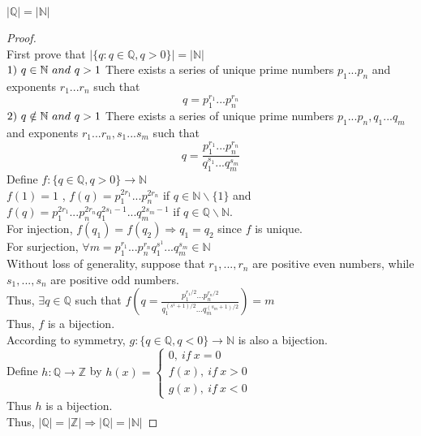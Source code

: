 \documentclass{article}
\begin{document}
\begin{flushleft}
	$\left|\mathbb{Q}\right|=\left|\mathbb{N}\right|$
\end{flushleft}
\begin{proof}
	~\\
	\linespread{1.5}
	First prove that $\left|\{q:q\in\mathbb{Q},q>0\}\right|=\left|\mathbb{N}\right|$\\
	$1)\ q\in\mathbb{N}\ and\ q>1\\$
	There exists a series of unique prime numbers $p_{1}...p_{n}$ and exponents $r_{1}...r_{n}$ such that \[q=p_{1}^{r_{1}}...p_{n}^{r_{n}}\]
	$2)\ q\notin\mathbb{N}\ and\ q>1\\$
	There exists a series of unique prime numbers $p_{1}...p_{n},q_{1}...q_{m}$ and exponents $r_{1}...r_{n},s_{1}...s_{m}$ such that \[q=\frac{p_{1}^{r_{1}}...p_{n}^{r_{n}}}{q_{1}^{s_{1}}...q_{m}^{s_{m}}}\]
	Define $f:\{q\in\mathbb{Q},q>0\}\rightarrow\mathbb{N}$\\ $f(1)=1$ , $f(q)=p_{1}^{2r_{1}}...p_{n}^{2r_{n}}$ if $q\in\mathbb{N}\backslash\{1\}$ and \\$f(q)=p_{1}^{2r_{1}}...p_{n}^{2r_{n}}q_{1}^{2s_{1}-1}...q_{m}^{2s_{m}-1}$ if $q\in\mathbb{Q}\backslash\mathbb{N}$.\\
	For injection, $f(q_{1})=f(q_{2})\Rightarrow q_{1}=q_{2}$ since $f$ is unique.\\
	For surjection, $\forall m=p_{1}^{r_{1}}...p_{n}^{r_{n}}q_{1}^{s^{1}}...q_{m}^{s_{m}}\in\mathbb{N}$\\
	Without loss of generality, suppose that $r_{1},...,r_{n}$ are positive even numbers, while $s_{1},...,s_{n}$ are positive odd numbers. \\
	Thus, $\exists q\in\mathbb{Q}$ such that $f(q=\frac{p_{1}^{r_{1}/2}...p_{n}^{r_{n}/2}}{q_{1}^{(s^{1}+1)/2}...q_{m}^{(s_{m}+1)/2}})=m$\\
	Thus, $f$ is a bijection.\\
	According to symmetry, $g:\{q\in\mathbb{Q},q<0\}\rightarrow\mathbb{N}$ is also a bijection.\\
	Define $h:\mathbb{Q}\rightarrow\mathbb{Z}$ by 
		$h(x)=\begin{cases}
			0 ,\ if\ x=0\\
			f(x) ,\ if\ x>0\\
			g(x) ,\ if\ x<0
		\end{cases}$\\
	Thus $h$ is a bijection.\\
	Thus, $\left|\mathbb{Q}\right|=\left|\mathbb{Z}\right|\Rightarrow\left|\mathbb{Q}\right|=\left|\mathbb{N}\right|$
	
	
\end{proof}
\end{document}
